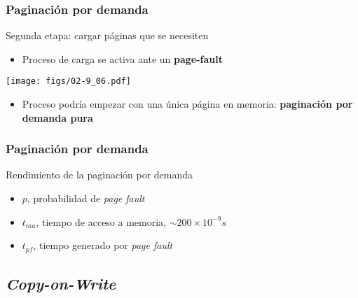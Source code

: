 \documentclass[letter]{beamer}
\begin{document}
\begin{frame}
  \frametitle{Paginación por demanda}

  Segunda etapa: cargar páginas que se necesiten
  
  \begin{itemize}
    \item Proceso de carga se activa ante un {\bf page-fault}
  \end{itemize}

  \begin{center}
    \texttt{[image: figs/02-9\_06.pdf]}
  \end{center}

  \begin{itemize}
    \item Proceso podría empezar con una única página en memoria: {\bf paginación por demanda pura}
  \end{itemize}

\end{frame}
\begin{frame}
  \frametitle{Paginación por demanda}

  Rendimiento de la paginación por demanda
  \begin{itemize}
    \item $p$, probabilidad de {\em page fault}
    \item $t_{ma}$, tiempo de acceso a memoria, $\sim 200 \times 10^{-9}s$
    \item $t_{pf}$, tiempo generado por {\em page fault}
  \end{itemize}
  
  
  
\end{frame}
\subsection{{\em Copy-on-Write}}
\end{document}
